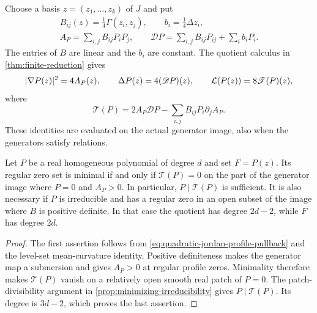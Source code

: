 Choose a basis $z=(z_1,\ldots,z_k)$ of $J$ and put
\begin{equation}\label{eq:quadratic-jordan-profile-data}
 \begin{gathered}
 B_{ij}(z)=\tfrac14\Gamma(z_i,z_j),\qquad
 b_i=\tfrac14\Delta z_i,\\
 A_P=\sum_{i,j}B_{ij}P_iP_j,\qquad
 \mathscr D P=\sum_{i,j}B_{ij}P_{ij}+\sum_i b_iP_i.
 \end{gathered}
\end{equation}
The entries of $B$ are linear and the $b_i$ are constant.
The quotient calculus in \cref{thm:finite-reduction} gives
\begin{equation}\label{eq:quadratic-jordan-profile-pullback}
 |\nabla P(z)|^2=4A_P(z),\qquad
 \Delta P(z)=4(\mathscr D P)(z),\qquad
 \mathcal L(P(z))=8\mathscr T(P)(z),
\end{equation}
where
\begin{equation}\label{eq:three-quadratic-profile-numerator}
 \mathscr T(P)=2A_P\mathscr D P
       -\sum_{i,j}B_{ij}P_i\partial_jA_P.
\end{equation}
These identities are evaluated on the actual generator image, also
when the generators satisfy relations.

\begin{proposition}
\label{prop:three-quadratic-profile-criterion}
\label{prop:quadratic-jordan-profile-criterion}
Let $P$ be a real homogeneous polynomial of degree $d$ and set
$F=P(z)$. Its regular zero set is minimal if and only if
$\mathscr T(P)=0$ on the part of the generator image where
$P=0$ and $A_P>0$. In particular, $P\mid\mathscr T(P)$ is
sufficient. It is also necessary if $P$ is irreducible and has a
regular zero in an open subset of the image where $B$ is positive
definite. In that case the quotient has degree $2d-2$, while $F$
has degree $2d$.
\end{proposition}

\begin{proof}
The first assertion follows from
\eqref{eq:quadratic-jordan-profile-pullback} and the level-set
mean-curvature identity. Positive definiteness makes the generator
map a submersion and gives $A_P>0$ at regular profile zeros.
Minimality therefore makes $\mathscr T(P)$ vanish on a relatively
open smooth real patch of $P=0$. The patch-divisibility argument in
\cref{prop:minimizing-irreducibility} gives $P\mid\mathscr T(P)$.
Its degree is $3d-2$, which proves the last assertion.
\end{proof}


